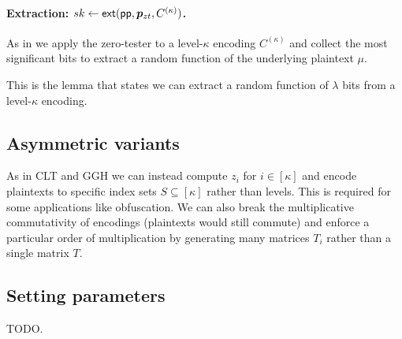\paragraph{Extraction: $sk \leftarrow \mathsf{ext}(\mathsf{pp}, \bm{p}_{zt}, C^{(\kappa)})$.}  As in \cite{ggh13a, clt15} we apply the zero-tester to a level-$\kappa$ encoding $C^{(\kappa)}$ and collect the most significant bits to extract a random function of the underlying plaintext $\mu$.

\begin{lemma}
\label{extraction}
This is the lemma that states we can extract a random function of $\lambda$ bits from a level-$\kappa$ encoding.
\end{lemma}

\subsection{Asymmetric variants}

As in CLT and GGH we can instead compute $z_i$ for $i \in [\kappa]$ and encode plaintexts to specific index sets $S \subseteq [\kappa]$ rather than levels.  This is required for some applications like obfuscation.  We can also break the multiplicative commutativity of encodings (plaintexts would still commute) and enforce a particular order of multiplication by generating many matrices $T_i$ rather than a single matrix $T$.

\subsection{Setting parameters}

TODO.



